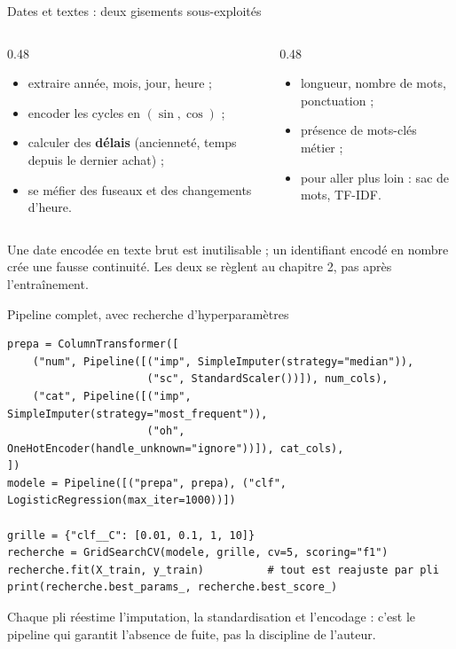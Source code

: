 \begin{frame}{Dates et textes : deux gisements sous-exploités}
\begin{columns}[t]
\begin{column}{0.48\textwidth}
\begin{ebox}[Dates]
\begin{itemize}
  \item extraire année, mois, jour, heure ;
  \item encoder les cycles en $(\sin,\cos)$ ;
  \item calculer des \textbf{délais} (ancienneté, temps depuis le dernier
        achat) ;
  \item se méfier des fuseaux et des changements d'heure.
\end{itemize}
\end{ebox}
\end{column}
\begin{column}{0.48\textwidth}
\begin{ebox}[Textes]
\begin{itemize}
  \item longueur, nombre de mots, ponctuation ;
  \item présence de mots-clés métier ;
  \item pour aller plus loin : sac de mots, TF-IDF.
\end{itemize}
\end{ebox}
\end{column}
\end{columns}
\vspace{1.5mm}
\begin{wbox}[Le piège]
Une date encodée en texte brut est inutilisable ; un identifiant encodé en
nombre crée une fausse continuité. Les deux se règlent au chapitre 2, pas
après l'entraînement.
\end{wbox}
\end{frame}

\begin{frame}[fragile]{Pipeline complet, avec recherche d'hyperparamètres}
\begin{codebox}
\begin{lstlisting}
prepa = ColumnTransformer([
    ("num", Pipeline([("imp", SimpleImputer(strategy="median")),
                      ("sc", StandardScaler())]), num_cols),
    ("cat", Pipeline([("imp", SimpleImputer(strategy="most_frequent")),
                      ("oh", OneHotEncoder(handle_unknown="ignore"))]), cat_cols),
])
modele = Pipeline([("prepa", prepa), ("clf", LogisticRegression(max_iter=1000))])

grille = {"clf__C": [0.01, 0.1, 1, 10]}
recherche = GridSearchCV(modele, grille, cv=5, scoring="f1")
recherche.fit(X_train, y_train)          # tout est reajuste par pli
print(recherche.best_params_, recherche.best_score_)
\end{lstlisting}
\end{codebox}
\vspace{1mm}
{\footnotesize Chaque pli réestime l'imputation, la standardisation et
l'encodage : c'est le pipeline qui garantit l'absence de fuite, pas la
discipline de l'auteur.}
\end{frame}

